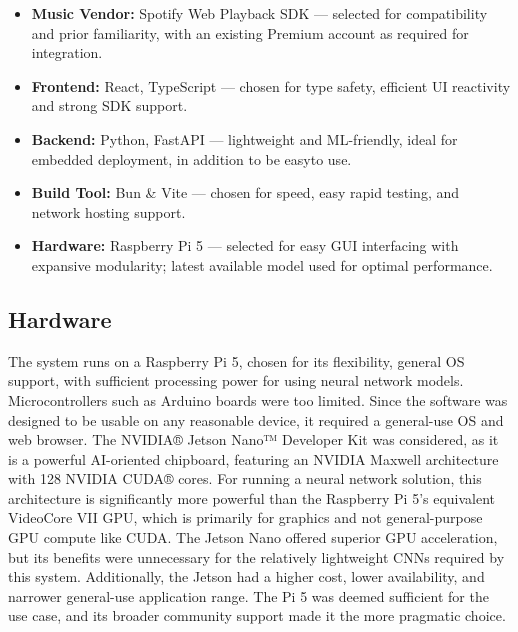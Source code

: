                 \begin{itemize}
                    \item \textbf{Music Vendor:} Spotify Web Playback SDK --- selected for compatibility and prior familiarity, with an existing Premium account as required for integration.
    
                    \item \textbf{Frontend:} React, TypeScript --- chosen for type safety, efficient UI reactivity and strong SDK support.
                    
                    \item \textbf{Backend:} Python, FastAPI --- lightweight and ML-friendly, ideal for embedded deployment, in addition to be easyto use.
                    
                    \item \textbf{Build Tool:} Bun \& Vite ---  chosen for speed, easy rapid testing, and network hosting support.
    
                    \item \textbf{Hardware:} Raspberry Pi 5 --- selected for easy GUI interfacing with expansive modularity; latest available model used for optimal performance.
                \end{itemize}
    
    
        \subsection{Hardware}
    
            The system runs on a Raspberry Pi 5, chosen for its flexibility, general OS support, with sufficient processing power for using neural network models. Microcontrollers such as Arduino boards were too limited. Since the software was designed to be usable on any reasonable device, it required a general-use OS and web browser. The NVIDIA® Jetson Nano™ Developer Kit was considered, as it is a powerful AI-oriented chipboard, featuring an NVIDIA Maxwell architecture with 128 NVIDIA CUDA® cores. For running a neural network solution, this architecture is significantly more powerful than the Raspberry Pi 5's equivalent VideoCore VII GPU, which is primarily for graphics and not general-purpose GPU compute like CUDA. The Jetson Nano offered superior GPU acceleration, but its benefits were unnecessary for the relatively lightweight CNNs required by this system. Additionally, the Jetson had a higher cost, lower availability, and narrower general-use application range. The Pi 5 was deemed sufficient for the use case, and its broader community support made it the more pragmatic choice.
            
